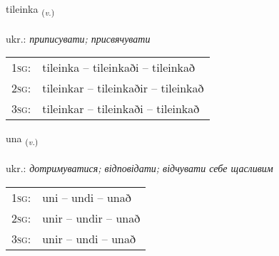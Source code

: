 \documentclass[frontgrid, backgrid]{flacards}\usepackage[]{graphicx}\usepackage[]{xcolor}
\begin{document}
\renewcommand{\flhead}{\vskip5pt \fboxsep=0pt {\small\bfseries\footnotesize Sagnorð | дієслово}}
\renewcommand{\fcfoot}{\vskip5pt \fboxsep=0pt \hspace{2pt}{\small\bfseries\footnotesize 3K}}

\renewcommand{\blhead}{\vskip5pt {\small\bfseries\footnotesize Sagnorð | дієслово }}
\renewcommand{\bcfoot}{\vskip5pt \hspace{2pt}{\small\bfseries\footnotesize 3K}}


{tileinka \small{\textsubscript{(\textit{v.})}} \\[1ex] %
\textphonetic{[tʰɪːleiŋ̥ka]} \\
ukr.: \emph{приписувати; присвячувати} \\  [2ex]
\renewcommand*{\arraystretch}{0.8}
\begin{tabular}{p{1cm}l}
\textsc{1sg}: & tileinka -- tileinkaði -- tileinkað \\ 
\textsc{2sg}: & tileinkar -- tileinkaðir -- tileinkað \\ 
\textsc{3sg}: & tileinkar -- tileinkaði -- tileinkað \\ 
\end{tabular}
}

\renewcommand{\flhead}{\vskip5pt \fboxsep=0pt {\small\bfseries\footnotesize Sagnorð | дієслово}}
\renewcommand{\fcfoot}{\vskip5pt \fboxsep=0pt \hspace{2pt}{\small\bfseries\footnotesize 3K}}

\renewcommand{\blhead}{\vskip5pt {\small\bfseries\footnotesize Sagnorð | дієслово }}
\renewcommand{\bcfoot}{\vskip5pt \hspace{2pt}{\small\bfseries\footnotesize 3K}}


{una \small{\textsubscript{(\textit{v.})}} \\[1ex] %
\textphonetic{[ʏːna]} \\
ukr.: \emph{дотримуватися; відповідати; відчувати себе щасливим} \\  [2ex]
\renewcommand*{\arraystretch}{0.8}
\begin{tabular}{p{1cm}l}
\textsc{1sg}: & uni -- undi -- unað \\ 
\textsc{2sg}: & unir -- undir -- unað \\ 
\textsc{3sg}: & unir -- undi -- unað \\ 
\end{tabular}
}
\end{document}
